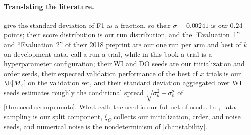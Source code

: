 \begin{refsection}
\paragraph{Translating the literature.} \Textcite{ReimersGurevych2017} give the standard deviation of F1 as a fraction, so their $\sigma=0.00241$ is our 0.24 points; their score distribution is our run distribution, and the ``Evaluation~1'' and ``Evaluation~2'' of their 2018 preprint are our one run per arm and best of $k$ on development data. \Textcite{DodgeEtAl2020} call a run a trial, while in this book a trial is a hyperparameter configuration; their WI and DO seeds are our initialization and order seeds, their expected validation performance of the best of $x$ trials is our $\E[M_x]$ on the validation set, and their standard deviation aggregated over WI seeds estimates roughly the conditional spread $\sqrt{\sigma_b^2+\sigma_e^2}$ of \cref{thm:seeds:components}. What \textcite{Picard2021} calls the seed is our full set of seeds. In \textcite{BouthillierEtAl2021}, data sampling is our split component, $\xi_O$ collects our initialization, order, and noise seeds, and numerical noise is the nondeterminism of \cref{ch:instability}.

\printchapterbib
\end{refsection}

